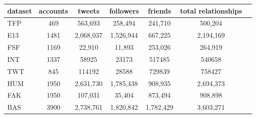 \documentclass[a4paper,11pt]{article}
\begin{document}
\begin{tabular}{lcccccc}
dataset & accounts & tweets & followers & friends & total relationships \\
\hline
TFP & 469 & 563,693 & 258,494 & 241,710 & 500,204 \\
E13 & 1481 & 2,068,037 & 1,526,944 & 667,225 & 2,194,169 \\
FSF & 1169 & 22,910 & 11,893 & 253,026 & 264,919 \\
INT & 1337 & 58925 & 23173 & 517485 & 540658 \\
TWT & 845 & 114192 & 28588 & 729839 & 758427 \\
\hline
HUM & 1950 & 2,631,730 & 1,785,438 & 908,935 & 2,694,373 \\
FAK & 1950 & 107,031 & 35,404 & 873,494 & 908,898 \\
\hline
BAS & 3900 & 2,738,761 & 1,820,842 & 1,782,429 & 3,603,271 \\
\end{tabular}



\end{document}
